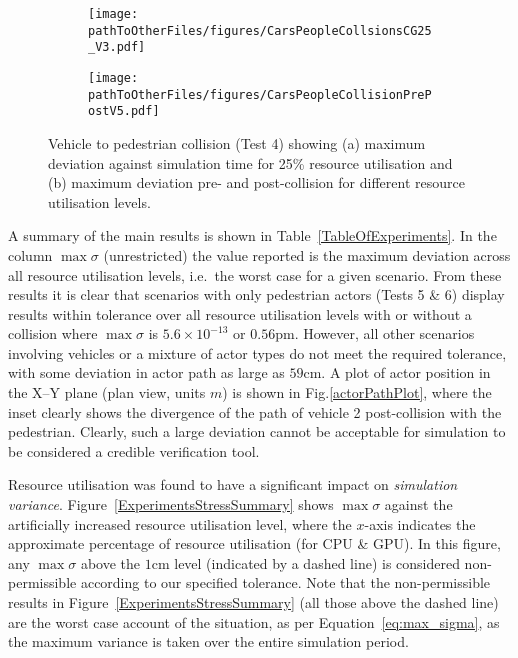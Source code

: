 \begin{figure*}[h]
    \centering
    \begin{subfigure}{.49\textwidth}
        \texttt{[image: \\pathToOtherFiles/figures/CarsPeopleCollsionsCG25\_V3.pdf]}
        \caption{}
        \label{CarsPeopleCollsionsCG25}
    \end{subfigure}
    \begin{subfigure}{.49\textwidth}
        \texttt{[image: \\pathToOtherFiles/figures/CarsPeopleCollisionPrePostV5.pdf]}
        \caption{}
        \label{CarsPeopleCollisionPrePost}
    \end{subfigure}
    \caption{Vehicle to pedestrian collision (Test 4) showing (a) maximum deviation against simulation time for 25\% resource utilisation and (b) maximum deviation pre- and post-collision for different resource utilisation levels.}
\end{figure*}

A summary of the main results is shown in Table~\ref{TableOfExperiments}.  In the column $\max\sigma$ (unrestricted) the value reported is the maximum deviation across all resource utilisation levels, i.e.\ the worst case for a given scenario. From these results it is clear that scenarios with only pedestrian actors (Tests 5 \& 6) display results within tolerance over all resource utilisation levels with or without a collision where $\max\sigma$ is $5.6\times10^{-13}$ or $0.56\si{\pico\metre}$. However, all other scenarios involving vehicles or a mixture of actor types do not meet the required tolerance, with some deviation in actor path as large as $59$cm. 
%
A plot of actor position in the X--Y plane (plan view, units $m$) is shown in Fig.\ref{actorPathPlot}, where the inset clearly shows the divergence of the path of vehicle 2 post-collision with the pedestrian.
%
Clearly, such a large deviation cannot be acceptable for simulation to be considered a credible verification tool.

Resource utilisation was found to have a significant impact on \textit{simulation variance}. Figure~\ref{ExperimentsStressSummary} shows $\max\sigma$ against the artificially increased resource utilisation level, where the $x$-axis indicates the approximate percentage of resource utilisation (for CPU \& GPU). In this figure, any $\max\sigma$ above the $1$cm level (indicated by a dashed line) is considered non-permissible according to our specified tolerance. Note that the non-permissible results in Figure~\ref{ExperimentsStressSummary} (all those above the dashed line) are the worst case account of the situation, as per Equation~\ref{eq:max_sigma}, as the maximum variance is taken over the entire simulation period.

